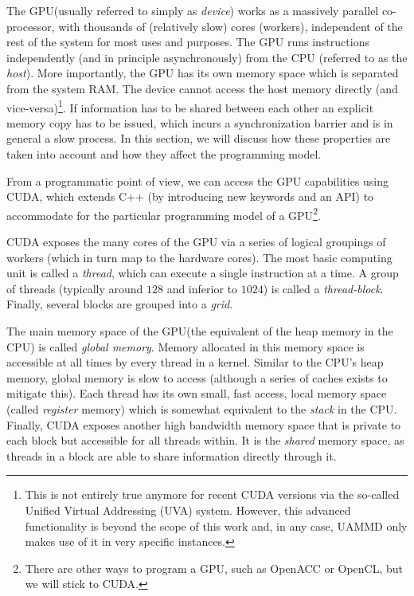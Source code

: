 \documentclass[ twoside,openright,titlepage,numbers=noenddot,%
headinclude,footinclude,cleardoublepage=empty,abstract=on,
BCOR=5mm,paper=a4,fontsize=11pt, dvipsnames
]{scrreprt}
\newcommand{\uammd}{\gls{UAMMD}\xspace}
\newcommand{\gpu}{\gls{GPU}\xspace}
\begin{document}
The \gpu (usually referred to simply as \emph{device}) works as a massively parallel co-processor, with thousands of (relatively slow) cores (workers), independent of the rest of the system for most uses and purposes. The \gpu runs instructions independently (and in principle asynchronously) from the CPU (referred to as the \emph{host}). More importantly, the \gpu has its own memory space which is separated from the system RAM. The device cannot access the host memory directly (and vice-versa)\footnote{This is not entirely true anymore for recent CUDA versions via the so-called Unified Virtual Addressing (UVA) system. However, this advanced functionality is beyond the scope of this work and, in any case, \uammd only makes use of it in very specific instances.}. If information has to be shared between each other an explicit memory copy has to be issued, which incurs a synchronization barrier and is in general a slow process. In this section, we will discuss how these properties are taken into account and how they affect the programming model.

From a programmatic point of view, we can access the \gpu capabilities using CUDA, which extends C++ (by introducing new keywords and an \gls{API}) to accommodate for the particular programming model of a \gpu\footnote{There are other ways to program a \gpu, such as OpenACC\cite{openacc} or OpenCL\cite{Stone2010}, but we will stick to CUDA.}.

CUDA exposes the many cores of the \gpu via a series of logical groupings of workers (which in turn map to the hardware cores). The most basic computing unit is called a \emph{thread}, which can execute a single instruction at a time. A group of threads (typically around $128$ and inferior to $1024$) is called a \emph{thread-block}. Finally, several blocks are grouped into a \emph{grid}.

The main memory space of the \gpu (the equivalent of the heap memory in the CPU) is called \emph{global memory}. Memory allocated in this memory space is accessible at all times by every thread in a kernel. 
Similar to the CPU's heap memory, global memory is slow to access (although a series of caches exists to mitigate this).
Each thread has its own small, fast access, local memory space (called \emph{register} memory) which is somewhat equivalent to the \emph{stack} in the CPU.
Finally, CUDA exposes another high bandwidth memory space that is private to each block but accessible for all threads within. It is the \emph{shared} memory space, as threads in a block are able to share information directly through it.
\end{document}
